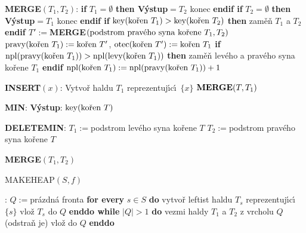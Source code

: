 {\bf MERGE$(T_1,T_2)$}:\newline 
{\bf if} $T_1=\emptyset$ {\bf then V\'ystup$=T_2$} konec {\bf endif\newline 
if} $T_2=\emptyset$ {\bf then V\'ystup$=T_1$} konec {\bf endif\newline 
if} $\key(\text{\rm ko\v ren }T_1)>\key(\text{\rm ko\v ren }T_2)$ {\bf then\newline}
\phantom{---}zam\v e\v n $T_1$ a $T_2$\newline 
{\bf endif\newline 
$T':=$MERGE$(\text{{\rm podstrom prav\'eho syna ko\v rene }}T_1,T_
2)$\newline 
$\pravy(\text{{\rm {\rm ko\v ren }}}T_1):=\text{{\rm {\rm ko\v ren }}}
T'$}, 
$\otec(\text{\rm ko\v ren }T'):=\text{\rm ko\v ren }T_1$\newline 
{\bf if} $\npl(\pravy(\text{\rm ko\v ren }T_1))>\npl(\levy(\text{\rm ko\v ren }
T_1))$ {\bf then}\newline
\phantom{---}zam\v e\v n lev\'eho a prav\'eho syna ko\v rene $T_1$\newline 
{\bf endif\newline 
$\npl(\text{{\rm {\rm ko\v ren }}}T_1):=\npl(\pravy(\text{{\rm {\rm ko\v ren }}}
T_1))+1$}
\bigskip

{\bf INSERT$(x)$}:\newline 
Vytvo\v r haldu $T_1$ reprezentuj\'\i c\'\i\ $\{x\}$\newline 
$\bold M\bold E\bold R\bold G\bold E(T,T_1)$
\bigskip

{\bf MIN}:\newline 
{\bf V\'ystup}: $\key(\text{\rm ko\v ren }T)$
\bigskip

{\bf DELETEMIN}:\newline 
$T_1:=$podstrom lev\'eho syna ko\v rene $T$\newline 
$T_2:=$podstrom prav\'eho syna ko\v rene $T$\newline 
{\bf MERGE$(T_1,T_2)$
\bigskip

MAKEHEAP$(S,f)$}:\newline 
$Q:=$pr\'azdn\'a fronta\newline 
{\bf for every} $s\in S$ {\bf do}\newline 
\phantom{---}vytvo\v r leftist haldu $T_s$ reprezentuj\'\i c\'\i\ $\{s\}$\newline 
\phantom{---}vlo\v z $T_s$ do $Q$\newline 
{\bf enddo\newline 
while} $|Q|>1$ {\bf do}\newline 
\phantom{---}vezmi haldy $T_1$ a $T_2$ z vrcholu $Q$ (odstra\v n je)\newline 
\phantom{---}{\bf MERGE$(T_1,T_2)$} vlo\v z do $Q$\newline
{\bf enddo}
\bigskip

